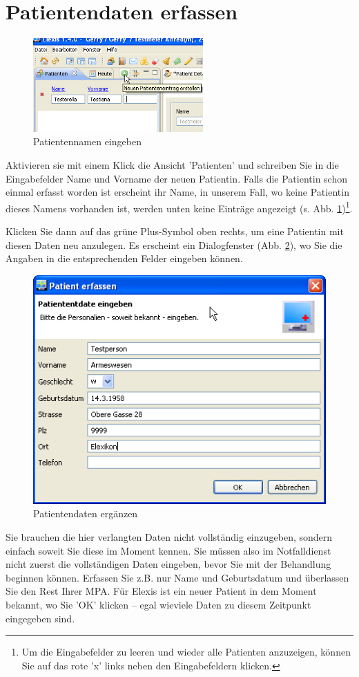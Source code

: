 \section{Patientendaten erfassen}
\begin{figure}
	\includegraphics[width=6.5cm]{images/einf1}
	\caption{Patientennamen eingeben}\label{fig:patname}
\end{figure}
Aktivieren sie mit einem Klick die Ansicht 'Patienten' und schreiben Sie in die Eingabefelder Name und Vorname der neuen Patientin.
Falls die Patientin schon einmal erfasst worden ist erscheint ihr Name, in unserem Fall, wo keine Patientin dieses Namens vorhanden ist, werden unten keine Einträge angezeigt (s. Abb. \ref{fig:patname})\footnote{Um die Eingabefelder zu leeren und wieder alle Patienten anzuzeigen, können Sie auf das rote 'x' links neben den Eingabefeldern klicken.}.

Klicken Sie dann auf das grüne Plus-Symbol oben rechts, um eine Patientin mit diesen
Daten neu anzulegen. Es erscheint ein Dialogfenster (Abb. \ref{fig:patdata}), wo
Sie die Angaben in die entsprechenden Felder eingeben können.\\
\bigskip

\begin{figure}[ht]
	\includegraphics{images/einf2}
	\caption{Patientendaten ergänzen}
	\label{fig:patdata}
\end{figure}
Sie brauchen die hier verlangten Daten nicht vollständig einzugeben, sondern einfach soweit Sie diese im Moment kennen.
Sie müssen also im Notfalldienst nicht zuerst die vollständigen Daten eingeben, bevor Sie mit der Behandlung beginnen können.
Erfassen Sie z.B. nur Name und Geburtsdatum und überlassen Sie den Rest Ihrer MPA. Für Elexis ist ein neuer Patient in dem Moment bekannt,
wo Sie 'OK' klicken -- egal wieviele Daten zu diesem Zeitpunkt eingegeben sind.

